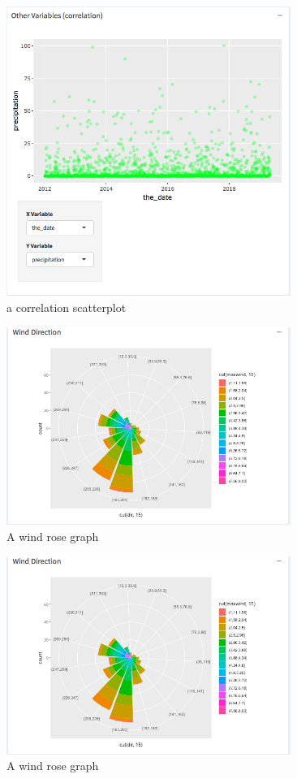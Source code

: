 \documentclass[10pt,letterpaper]{article}
\begin{document}
\begin{figure}
\includegraphics[width=350px]{correlation} \caption{a correlation scatterplot}\label{fig:unnamed-chunk-6}
\end{figure}

\begin{figure}
\includegraphics[width=350px]{WindRose} \caption{A wind rose graph}\label{fig:unnamed-chunk-7}
\end{figure}

\begin{figure}
\includegraphics[width=350px]{WindRose} \caption{A wind rose graph}\label{fig:unnamed-chunk-8}
\end{figure}
\end{document}
